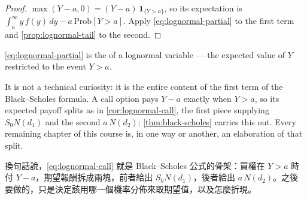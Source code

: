 \begin{proof}
	$\max(Y-a,0)=(Y-a)\,\mathbf{1}_{\{Y>a\}}$, so its expectation is
	$\int_{a}^{\infty}y\,f(y)\,dy-a\,\mathrm{Prob}[Y>a]$.
	Apply \eqref{eq:lognormal-partial} to the first term and \autoref{prop:lognormal-tail} to the second.
\end{proof}

\begin{moral}
	\eqref{eq:lognormal-partial} is the  of a lognormal variable --- the expected value of $Y$ restricted to the event $Y>a$.

	It is not a technical curiosity: it is the entire content of the first term of the Black--Scholes formula.
	A call option pays $Y-a$ exactly when $Y>a$, so its expected payoff splits as in \autoref{cor:lognormal-call},
	the first piece supplying $S_{0}N(d_{1})$ and the second $a\,N(d_{2})$; \autoref{thm:black-scholes} carries this out.
	Every remaining chapter of this course is, in one way or another, an elaboration of that split.

	換句話說，\eqref{eq:lognormal-call} 就是 Black--Scholes 公式的骨架：買權在 $Y>a$ 時付 $Y-a$，期望報酬拆成兩塊，前者給出 $S_{0}N(d_{1})$，後者給出 $a\,N(d_{2})$。之後要做的，只是決定該用哪一個機率分佈來取期望值，以及怎麼折現。
\end{moral}
\suppend
